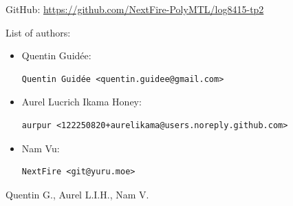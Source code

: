\documentclass[letterpaper,headings=standardclasses,parskip=half]{scrartcl}
\begin{document}
GitHub: \url{https://github.com/NextFire-PolyMTL/log8415-tp2}

List of authors:

\begin{itemize}
    \item Quentin Guidée:
          \begin{lstlisting}
Quentin Guidée <quentin.guidee@gmail.com>
\end{lstlisting}
    \item Aurel Lucrich Ikama Honey:
          \begin{lstlisting}
aurpur <122250820+aurelikama@users.noreply.github.com>
\end{lstlisting}
    \item Nam Vu:
          \begin{lstlisting}
NextFire <git@yuru.moe>
\end{lstlisting}
\end{itemize}


Quentin G., Aurel L.I.H., Nam V.

\end{document}
